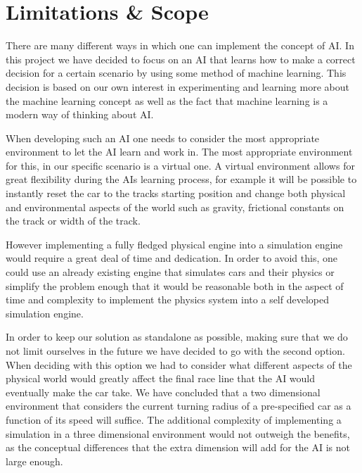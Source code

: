 

\chapter{Limitations \& Scope}
There are many different ways in which one can implement the concept of AI. In this project we have decided to focus on an AI that learns how to make a correct decision for a certain scenario by using some method of machine learning. This decision is based on our own interest in experimenting and learning more about the machine learning concept as well as the fact that machine learning is a modern way of thinking about AI.

When developing such an AI one needs to consider the most appropriate environment to let the AI learn and work in. The most appropriate environment for this, in our specific scenario is a virtual one. A virtual environment allows for great flexibility during the AIs learning process, for example it will be possible to instantly reset the car to the tracks starting position and change both physical and environmental aspects of the world such as gravity, frictional constants on the track or width of the track.

However implementing a fully fledged physical engine into a simulation engine would require a great deal of time and dedication. In order to avoid this, one could use an already existing engine that simulates cars and their physics or simplify the problem enough that it would be reasonable both in the aspect of time and complexity to implement the physics system into a self developed simulation engine.

In order to keep our solution as standalone as possible, making sure that we do not limit ourselves in the future we have decided to go with the second option. When deciding with this option we had to consider what different aspects of the physical world would greatly affect the final race line that the AI would eventually make the car take. We have concluded that a two dimensional environment that considers the current turning radius of a pre-specified car as a function of its speed will suffice. The additional complexity of implementing a simulation in a three dimensional environment would not outweigh the benefits, as the conceptual differences that the extra dimension will add for the AI is not large enough.

